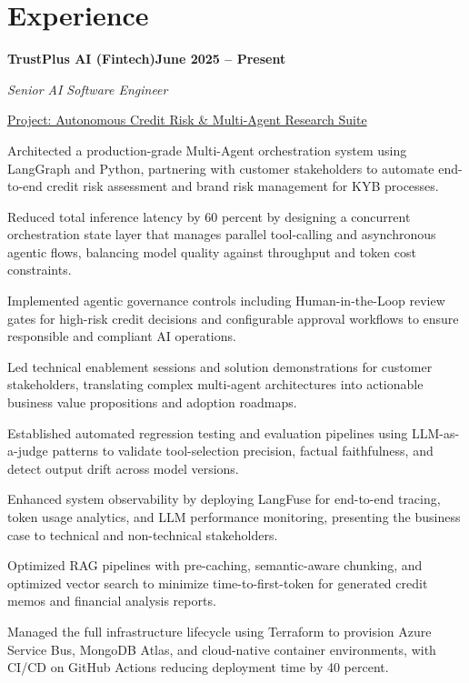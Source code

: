 \documentclass[letterpaper,10pt]{article}
\newcommand{\headingBf}[2]{\par\noindent\hspace*{10pt}\textbf{#1}\hfill\textbf{#2}}
\newcommand{\headingIt}[2]{\par\noindent\hspace*{10pt}\textit{#1}\hfill\textit{#2}}
\newenvironment{resume_list}{\vspace{-7pt}\begin{itemize}[itemsep=-2px, parsep=1pt, leftmargin=30pt]}{\end{itemize}}
\newcommand{\itemTitle}[1]{\item[] \underline{#1}\vspace{4pt}}
\begin{document}
  \section{Experience}

  \headingBf{TrustPlus AI (Fintech)}{June 2025 -- Present}
  \headingIt{Senior AI Software Engineer}{}
  \begin{resume_list}
    \itemTitle{Project: Autonomous Credit Risk \& Multi-Agent Research Suite}
    \item Architected a production-grade Multi-Agent orchestration system using LangGraph and Python, partnering with customer stakeholders to automate end-to-end credit risk assessment and brand risk management for KYB processes.
    \item Reduced total inference latency by 60 percent by designing a concurrent orchestration state layer that manages parallel tool-calling and asynchronous agentic flows, balancing model quality against throughput and token cost constraints.
    \item Implemented agentic governance controls including Human-in-the-Loop review gates for high-risk credit decisions and configurable approval workflows to ensure responsible and compliant AI operations.
    \item Led technical enablement sessions and solution demonstrations for customer stakeholders, translating complex multi-agent architectures into actionable business value propositions and adoption roadmaps.
    \item Established automated regression testing and evaluation pipelines using LLM-as-a-judge patterns to validate tool-selection precision, factual faithfulness, and detect output drift across model versions.
    \item Enhanced system observability by deploying LangFuse for end-to-end tracing, token usage analytics, and LLM performance monitoring, presenting the business case to technical and non-technical stakeholders.
    \item Optimized RAG pipelines with pre-caching, semantic-aware chunking, and optimized vector search to minimize time-to-first-token for generated credit memos and financial analysis reports.
    \item Managed the full infrastructure lifecycle using Terraform to provision Azure Service Bus, MongoDB Atlas, and cloud-native container environments, with CI/CD on GitHub Actions reducing deployment time by 40 percent.
  \end{resume_list}
\end{document}
